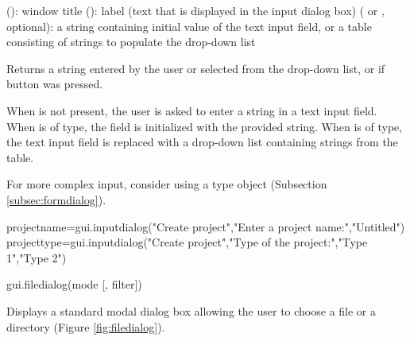 \documentclass[a4paper,12pt,twoside,extrafontsizes]{memoir}
\begin{document}
\begin{funcparams}
	 (): window title
	 (): label (text that is displayed in the input dialog box)
	 ( or , optional): a string containing initial value of the text input field, or a table consisting of strings to populate the drop-down list
\end{funcparams}

\begin{funcret}
	Returns a string entered by the user or selected from the drop-down list, or  if  button was pressed.
\end{funcret}

\begin{funcremarks}
	When  is not present, the user is asked to enter a string in a text input field. When  is of  type, the field is initialized with the provided string. When  is of  type, the text input field is replaced with a drop-down list containing strings from the table.
	
	For more complex input, consider using a  type object (Subsection \ref{subsec:formdialog}).
\end{funcremarks}

\begin{funcexamples}
\begin{shellcmds}\begin{luacode}
projectname=gui.inputdialog("Create project","Enter a project name:","Untitled")
projecttype=gui.inputdialog("Create project","Type of the project:",{"Type 1","Type 2"})
\end{luacode}\end{shellcmds}
\end{funcexamples}


\begin{luafuncprototype}
gui.filedialog(mode [, filter])
\end{luafuncprototype}

\begin{funcdescr}
	Displays a standard modal dialog box allowing the user to choose a file or a directory (Figure \ref{fig:filedialog}).
\end{funcdescr}
\end{document}
